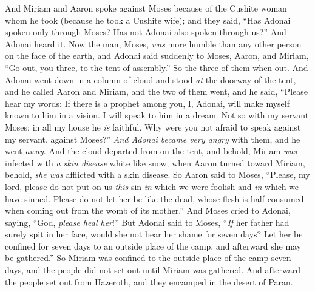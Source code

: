 \begin{biblechapter} %
 And Miriam and Aaron spoke against Moses because of the Cushite woman whom he took (because he took a Cushite wife);
\verse and they said, “Has Adonai spoken only through Moses? Has not Adonai also spoken through us?” And Adonai heard it.
\verse Now the man, Moses, \textit{was} more humble than any other person on the face of the earth,
\verse and Adonai said suddenly to Moses, Aaron, and Miriam, “Go out, you three, to the tent of assembly.” So the three of them when out.
\verse And Adonai went down in a column of cloud and stood \textit{at} the doorway of the tent, and he called Aaron and Miriam, and the two of them went,
\verse and he said,
\verse “Please hear my words: 
If there is a prophet among you, I, Adonai, 
will make myself known to him in a vision. 
I will speak to him in a dream.
\verse Not so with my servant Moses; 
in all my house he \textit{is} faithful. Why were you not afraid to speak against my servant, against Moses?”
\verse \textit{And Adonai became very angry} with them, and he went \textit{away}.
\verse And the cloud departed from on the tent, and behold, Miriam \textit{was} infected with \textit{a skin disease} white like snow; when Aaron turned toward Miriam, behold, \textit{she was} afflicted with a skin disease.
\verse So Aaron said to Moses, “Please, my lord, please do not put on us \textit{this} sin \textit{in} which we were foolish and \textit{in} which we have sinned.
\verse Please do not let her be like the dead, whose flesh is half consumed when coming out from the womb of its mother.”
\verse And Moses cried to Adonai, saying, “God, \textit{please heal her}!”
\verse But Adonai said to Moses, “\textit{If} her father had surely spit in her face, would she not bear her shame for seven days? Let her be confined for seven days to an outside place of the camp, and afterward she may be gathered.”
\verse So Miriam was confined to the outside place of the camp seven days, and the people did not set out until Miriam was gathered.
\verse And afterward the people set out from Hazeroth, and they encamped in the desert of Paran.
\end{biblechapter}

